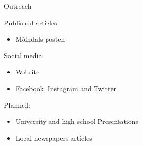 \documentclass[11pt, aspectratio=169]{beamer}
\begin{document}
\begin{frame}[c]{Outreach}
    \begin{minipage}[c]{0.40\linewidth}
        Published articles:
        \begin{itemize}
            \item Mölndals posten
        \end{itemize}
        Social media:        
        \begin{itemize}
            \item Website
            \item Facebook, Instagram and Twitter
        \end{itemize}
        Planned:
        \begin{itemize}
            \item University and high school Presentations
            \item Local newspapers articles
        \end{itemize}
    \end{minipage}
    \begin{minipage}[c]{0.30\linewidth}
        \begin{figure}[]
            \centering

\end{figure}
\end{minipage}
\end{frame}
\end{document}
